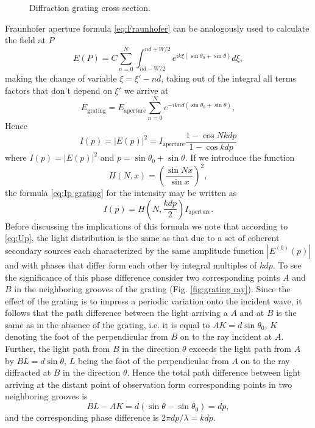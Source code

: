 \documentclass[12pt,twoside,english]{book}
\renewcommand{\~}{\perispomeni}%
\numberwithin{equation}{section}
\numberwithin{figure}{section}
\begin{document}
\begin{figure}[h]
\center{}
\caption{Diffraction grating cross section.}
\label{fig:grating ex}
\end{figure}
Fraunhofer aperture formula \ref{eq:Fraunhofer} can be analogously used to calculate the field at $P$
\begin{equation}
E\left(P\right)=C\sum_{n=0}^{N}\int_{nd-W/2}^{nd+W/2}e^{ik\xi\left(\sin\theta_{0}+\sin\theta\right)}d\xi,
\end{equation}
making the change of variable $\xi=\xi'-nd$, taking out of the integral all terms factors that don't depend on $\xi'$ we arrive at
\begin{equation}
E_{\text{grating}}=E_{\text{aperture}}\sum_{n=0}^{N}e^{-iknd\left(\sin\theta_{0}+\sin\theta\right)},
\label{eq:Up}
\end{equation}
Hence 
\begin{equation}
I\left(p\right)=\left|E\left(p\right)\right|^{2}=I_{\text{aperture}}\frac{1-\cos Nkdp}{1-\cos kdp}
\label{eq:Ip grating}
\end{equation}
where $I\left(p\right)=\left|E\left(p\right)\right|^{2}$ and $p=\sin\theta_{0}+\sin\theta$. If we introduce the function
\begin{equation}
H\left(N,x\right)=\left(\frac{\sin Nx}{\sin x}\right)^{2},
\end{equation}
the formula \ref{eq:Ip grating} for the intensity may be written as
\begin{equation}
I\left(p\right)=H\left(N,\frac{kdp}{2}\right)I_{\text{aperture}}.
\label{eq:intensity grating}
\end{equation}
Before discussing the implications of this formula we note that according to \ref{eq:Up}, the light distribution is the same as that due to a set of coherent secondary sources each characterized by the same amplitude function $\left|E^{\left(0\right)}\left(p\right)\right|$ and with phases that differ form each other by integral multiples of $kdp$. To see the significance of this phase difference consider two corresponding points $A$ and $B$ in the neighboring grooves of the grating (Fig. \ref{fig:grating ray}). Since the effect of the grating is to impress a periodic variation onto the incident wave, it follows that the path difference between the light arriving a $A$ and at $B$ is the same as in the absence of the grating, i.e. it is equal to $AK=d\sin\theta_{0}$, $K$ denoting the foot of the perpendicular from $B$ on to the ray incident at $A$. Further, the light path from $B$ in the direction $\theta$ exceeds the light path from $A$ by $BL=d\sin\theta$, $L$ being the foot of the perpendicular from $A$ on to the ray diffracted at $B$ in the direction $\theta.$ Hence the total path difference between light arriving at the distant point of observation form corresponding points in two neighboring grooves is
\begin{equation}
BL-AK=d\left(\sin\theta-\sin\theta_{0}\right)=dp,
\label{eq:path difference}
\end{equation}
 and the corresponding phase difference is $2\pi dp/\lambda=kdp$.
\end{document}
